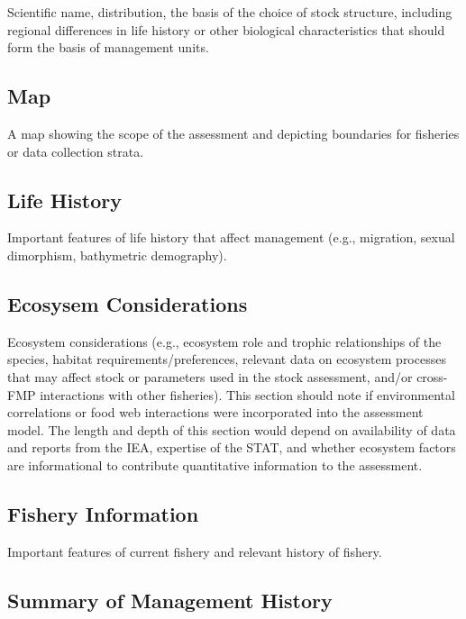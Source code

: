\documentclass[12pt,]{article}
\begin{document}
Scientific name, distribution, the basis of the choice of stock
structure, including regional differences in life history or other
biological characteristics that should form the basis of management
units.

\subsection{Map}\label{map}

A map showing the scope of the assessment and depicting boundaries for
fisheries or data collection strata.

\subsection{Life History}\label{life-history}

Important features of life history that affect management (e.g.,
migration, sexual dimorphism, bathymetric demography).

\subsection{Ecosysem Considerations}\label{ecosysem-considerations}

Ecosystem considerations (e.g., ecosystem role and trophic relationships
of the species, habitat requirements/preferences, relevant data on
ecosystem processes that may affect stock or parameters used in the
stock assessment, and/or cross-FMP interactions with other fisheries).
This section should note if environmental correlations or food web
interactions were incorporated into the assessment model. The length and
depth of this section would depend on availability of data and reports
from the IEA, expertise of the STAT, and whether ecosystem factors are
informational to contribute quantitative information to the assessment.

\subsection{Fishery Information}\label{fishery-information}

Important features of current fishery and relevant history of fishery.

\subsection{Summary of Management
History}\label{summary-of-management-history}
\end{document}
